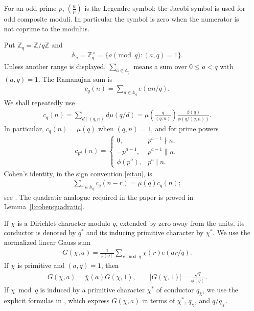 \documentclass[12pt,reqno]{amsart}
\numberwithin{equation}{section}
\theoremstyle{definition}
\theoremstyle{remark}
\begin{document}
For an odd prime $p$, $(\frac np)$ is the Legendre symbol; the Jacobi
symbol is used for odd composite moduli.  In particular the symbol is
zero when the numerator is not coprime to the modulus.

Put $\mathbb Z_q=\mathbb Z/q\mathbb Z$ and
\begin{align*}
 \mathbb A_q=\mathbb Z_q^\times
 =\{a\pmod q:(a,q)=1\}.
\end{align*}
Unless another range is displayed,
$\sum_{a\in\mathbb A_q}$ means a sum over $0\leq a<q$ with $(a,q)=1$.
The Ramanujan sum is
\begin{align}\label{e:tau}
 c_q(n)=\sum_{a\in\mathbb A_q}e(an/q).
\end{align}
We shall repeatedly use
\begin{align}\label{e:ramanujanformula}
 c_q(n)=\sum_{d\mid(q,n)}d\mu(q/d)
 =\mu\left(\frac q{(q,n)}\right)
   \frac{\phi(q)}{\phi(q/(q,n))}.
\end{align}
In particular, $c_q(n)=\mu(q)$ when $(q,n)=1$, and for prime powers
\begin{align}\label{e:ramprimepowerprelim}
 c_{p^a}(n)=
 \begin{cases}
  0,&p^{a-1}\nmid n,\\
  -p^{a-1},&p^{a-1}\parallel n,\\
  \phi(p^a),&p^a\mid n.
 \end{cases}
\end{align}
Cohen's identity, in the sign convention \eqref{e:tau}, is
\begin{align}\label{eq:Cohen}
 \sum_{r\in\mathbb A_q}c_q(n-r)=\mu(q)c_q(n);
\end{align}
see \cite[Corollary~7.2]{Cohen}.  The quadratic analogue required in
the paper is proved in Lemma~\ref{l:cohenquadratic}.


If $\chi$ is a Dirichlet character modulo $q$, extended by zero away
from the units, its conductor is denoted by $q^*$ and its inducing
primitive character by $\chi^*$.  We use the normalized linear Gauss
sum
\begin{align}\label{e:lineargauss}
 G(\chi,a)=\frac1{\phi(q)}
 \sum_{r\bmod q}\chi(r)e(ar/q).
\end{align}
If $\chi$ is primitive and $(a,q)=1$, then
\begin{align}\label{e:primitivegauss}
 G(\chi,a)=\overline{\chi}(a)G(\chi,1),\qquad
 |G(\chi,1)|=\frac{\sqrt q}{\phi(q)}.
\end{align}
If $\chi\bmod q$ is induced by a primitive character $\chi^*$ of
conductor $q_\chi$, we use the explicit formulas in
\cite[(3.3)--(3.5)]{trojan}, which express $G(\chi,a)$ in terms of
$\chi^*$, $q_\chi$, and $q/q_\chi$.
\end{document}
